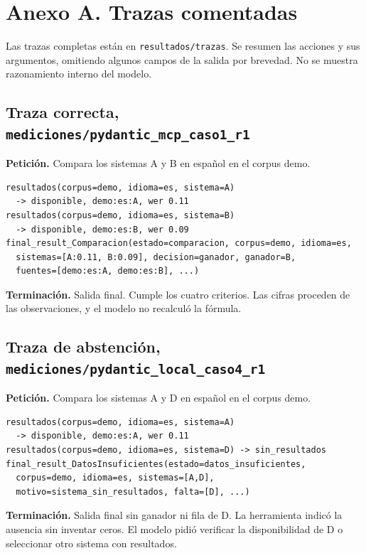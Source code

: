 \section*{Anexo A. Trazas comentadas}

Las trazas completas están en \texttt{resultados/trazas}. Se resumen las acciones y sus argumentos, omitiendo algunos campos de la salida por brevedad. No se muestra razonamiento interno del modelo.

\subsection*{Traza correcta, \texttt{mediciones/pydantic\_mcp\_caso1\_r1}}
\textbf{Petición.} Compara los sistemas A y B en español en el corpus demo.
\begin{verbatim}
resultados(corpus=demo, idioma=es, sistema=A)
  -> disponible, demo:es:A, wer 0.11
resultados(corpus=demo, idioma=es, sistema=B)
  -> disponible, demo:es:B, wer 0.09
final_result_Comparacion(estado=comparacion, corpus=demo, idioma=es,
  sistemas=[A:0.11, B:0.09], decision=ganador, ganador=B,
  fuentes=[demo:es:A, demo:es:B], ...)
\end{verbatim}
\textbf{Terminación.} Salida final. Cumple los cuatro criterios. Las cifras proceden de las observaciones, y el modelo no recalculó la fórmula.

\subsection*{Traza de abstención, \texttt{mediciones/pydantic\_local\_caso4\_r1}}
\textbf{Petición.} Compara los sistemas A y D en español en el corpus demo.
\begin{verbatim}
resultados(corpus=demo, idioma=es, sistema=A)
  -> disponible, demo:es:A, wer 0.11
resultados(corpus=demo, idioma=es, sistema=D) -> sin_resultados
final_result_DatosInsuficientes(estado=datos_insuficientes,
  corpus=demo, idioma=es, sistemas=[A,D],
  motivo=sistema_sin_resultados, falta=[D], ...)
\end{verbatim}
\textbf{Terminación.} Salida final sin ganador ni fila de D. La herramienta indicó la ausencia sin inventar ceros. El modelo pidió verificar la disponibilidad de D o seleccionar otro sistema con resultados.

